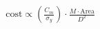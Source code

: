 \documentclass[preview]{standalone}
\begin{document}
\begin{align*}
\text{cost} \propto \left( \frac{C_m}{\sigma_y} \right) \cdot \frac{M \cdot \text{Area}}{D^2}
\end{align*}
\end{document}
